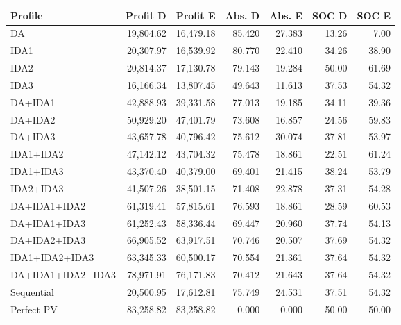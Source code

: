 \begingroup\small
\begin{longtable}{lrrrrrr}
\toprule
Profile & Profit D & Profit E & Abs. D & Abs. E & SOC D & SOC E\\
\midrule\endhead
DA & 19,804.62 & 16,479.18 & 85.420 & 27.383 & 13.26 & 7.00\\
IDA1 & 20,307.97 & 16,539.92 & 80.770 & 22.410 & 34.26 & 38.90\\
IDA2 & 20,814.37 & 17,130.78 & 79.143 & 19.284 & 50.00 & 61.69\\
IDA3 & 16,166.34 & 13,807.45 & 49.643 & 11.613 & 37.53 & 54.32\\
DA+IDA1 & 42,888.93 & 39,331.58 & 77.013 & 19.185 & 34.11 & 39.36\\
DA+IDA2 & 50,929.20 & 47,401.79 & 73.608 & 16.857 & 24.56 & 59.83\\
DA+IDA3 & 43,657.78 & 40,796.42 & 75.612 & 30.074 & 37.81 & 53.97\\
IDA1+IDA2 & 47,142.12 & 43,704.32 & 75.478 & 18.861 & 22.51 & 61.24\\
IDA1+IDA3 & 43,370.40 & 40,379.00 & 69.401 & 21.415 & 38.24 & 53.79\\
IDA2+IDA3 & 41,507.26 & 38,501.15 & 71.408 & 22.878 & 37.31 & 54.28\\
DA+IDA1+IDA2 & 61,319.41 & 57,815.61 & 76.593 & 18.861 & 28.59 & 60.53\\
DA+IDA1+IDA3 & 61,252.43 & 58,336.44 & 69.447 & 20.960 & 37.74 & 54.13\\
DA+IDA2+IDA3 & 66,905.52 & 63,917.51 & 70.746 & 20.507 & 37.69 & 54.32\\
IDA1+IDA2+IDA3 & 63,345.33 & 60,500.17 & 70.554 & 21.361 & 37.64 & 54.32\\
DA+IDA1+IDA2+IDA3 & 78,971.91 & 76,171.83 & 70.412 & 21.643 & 37.64 & 54.32\\
Sequential & 20,500.95 & 17,612.81 & 75.749 & 24.531 & 37.51 & 54.32\\
Perfect PV & 83,258.82 & 83,258.82 & 0.000 & 0.000 & 50.00 & 50.00\\
\bottomrule
\end{longtable}
\endgroup
